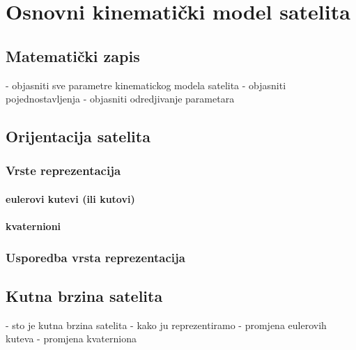 \documentclass[times, utf8, diplomski, numeric]{templates/template}
\begin{document}
\chapter{Osnovni kinematički model satelita}{
    \section{Matematički zapis}{
        - objasniti sve parametre kinematickog modela satelita
        - objasniti pojednostavljenja
        - objasniti odredjivanje parametara
    }
    
    \section{Orijentacija satelita}{   
        \subsection{Vrste reprezentacija}{
            \subsubsection{eulerovi kutevi (ili kutovi)}{

            }

            \subsubsection{kvaternioni}{

            }
        }

        \subsection{Usporedba vrsta reprezentacija}{

        }
    }
    
    \section{Kutna brzina satelita}{
        - sto je kutna brzina satelita
        - kako ju reprezentiramo
            - promjena eulerovih kuteva
            - promjena kvaterniona
    }
}
    
\end{document}
